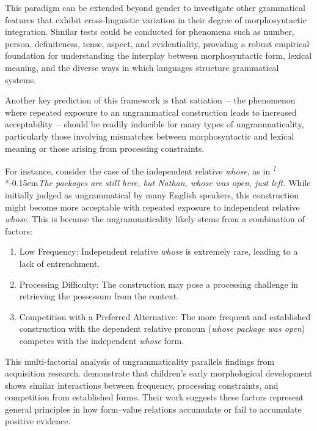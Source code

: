 \documentclass[12pt,letterpaper]{article}
\newcommand{\mention}[1]{\textit{#1}}
\newcommand{\judgesep}{\kern-0.15em}
\newcommand{\ungram}[1]{*\judgesep#1}
\begin{document}
This paradigm can be extended beyond gender to investigate other grammatical features that exhibit cross-linguistic variation in their degree of morphosyntactic integration. Similar tests could be conducted for phenomena such as number, person, definiteness, tense, aspect, and evidentiality, providing a robust empirical foundation for understanding the interplay between morphosyntactic form, lexical meaning, and the diverse ways in which languages structure grammatical systems.

\bigskip
Another key prediction of this framework is that satiation~--  the phenomenon where repeated exposure to an ungrammatical construction leads to increased acceptability~--  should be readily inducible for many types of ungrammaticality, particularly those involving mismatches between morphosyntactic and lexical meaning or those arising from processing constraints.

For instance, consider the case of the independent relative \mention{whose}, as in \textsuperscript{?}\ungram{\mention{The packages are still here, but Nathan, whose was open, just left.}} While initially judged as ungrammatical by many English speakers, this construction might become more acceptable with repeated exposure to independent relative \mention{whose}. This is because the ungrammaticality likely stems from a combination of factors:

\begin{enumerate}
    \item Low Frequency: Independent relative \mention{whose} is extremely rare, leading to a lack of entrenchment.
    \item Processing Difficulty: The construction may pose a processing challenge in retrieving the possessum from the context.
    \item Competition with a Preferred Alternative: The more frequent and established construction with the dependent relative pronoun (\textit{whose package was open}) competes with the independent \mention{whose} form.
\end{enumerate}

This multi-factorial analysis of ungrammaticality parallels findings from acquisition research. \textcite{dressler1995} demonstrate that children's early morphological development shows similar interactions between frequency, processing constraints, and competition from established forms. Their work suggests these factors represent general principles in how form--value relations accumulate or fail to accumulate positive evidence.
\end{document}
